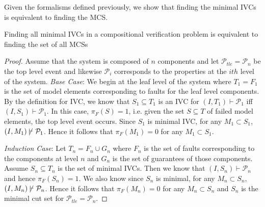Given the formalisms defined previously, we show that finding the minimal IVCs is equivalent to finding the MCS. \\

\begin{theorem} Finding all minimal IVCs in a compositional verification problem is equivalent to finding the set of all MCSs \\

\begin{proof} 
Assume that the system is composed of $n$ components and let $\mathcal{P}_{tle} = \mathcal{P}_n$ be the top level event and likewise $\mathcal{P}_{i}$ corresponds to the properties at the $i{th}$ level of the system. 
\textit{Base Case}:
We begin at the leaf level of the system where $T_1 = F_1$ is the set of model elements corresponding to faults for the leaf level components. By the definition for IVC, we know that $S_1 \subseteq T_1$ is an IVC for $(I, T_1) \vdash \mathcal{P}_{1}$ iff $(I, S_1) \vdash \mathcal{P}_{1}$.
In this case, $\pi_F(S) = 1$, i.e. given the set $S \subseteq T$ of failed model elements, the top level event occurs. 
Since $S_1$ is minimal IVC, for any $M_1 \subset S_1$, $(I, M_1) \mkern-2mu\not\mkern2mu\vdash \mathcal{P}_{1}$. Hence it follows that $\pi_F(M_1) = 0$ for any $M_1 \subset S_1$.

\textit{Induction Case}:
Let $T_{n} = F_{n} \cup G_{n}$ where $F_{n}$ is the set of faults corresponding to the components at level ${n}$ and $G_{n}$ is the set of guarantees of those components. Assume $S_{n} \subseteq T_{n}$ is the set of minimal IVCs. Then we know that $(I, S_{n}) \vdash \mathcal{P}_{n}$ and hence $\pi_F(S_{n}) = 1$. We also know since $S_{n}$ is minimal, for any $M_{n} \subset S_{n}$, $(I, M_{n}) \mkern-2mu\not\mkern2mu\vdash \mathcal{P}_{n}$. Hence it follows that $\pi_F(M_{n}) = 0$ for any $M_{n} \subset S_{n}$ and $S_{n}$ is the minimal cut set for $\mathcal{P}_{tle} = \mathcal{P}_n$.

\end{proof}
\end{theorem}

 



